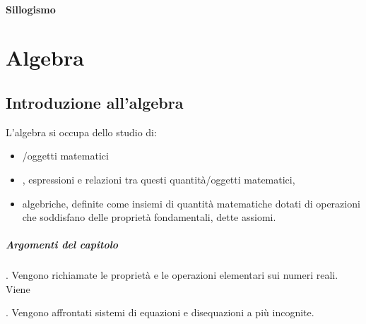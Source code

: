 \documentclass[letterpaper,10pt,italian]{jupyterBook}
\begin{document}
\subsection{Sillogismo}
\label{\detokenize{ch/logics:sillogismo}}\label{\detokenize{ch/logics:logics-syllogism}}
\sphinxstepscope


\part{Algebra}

\sphinxstepscope




\chapter{Introduzione all’algebra}
\label{\detokenize{ch/algebra:introduzione-all-algebra}}\label{\detokenize{ch/algebra:math-hs-algebra}}\label{\detokenize{ch/algebra::doc}}
\sphinxAtStartPar
L’algebra si occupa dello studio di:
\begin{itemize}
\item {} 
\sphinxAtStartPar
{}/oggetti matematici

\item {} 
\sphinxAtStartPar
{}, espressioni e relazioni tra questi quantità/oggetti matematici,

\item {} 
\sphinxAtStartPar
{} algebriche, definite come insiemi di quantità matematiche dotati di operazioni che soddisfano delle proprietà fondamentali, dette assiomi.

\end{itemize}
\subsubsection*{Argomenti del capitolo}

\sphinxAtStartPar
{\hyperref[\detokenize{ch/algebra/real-algebra:math-hs-algebra-real}]{}}. Vengono richiamate le proprietà e le operazioni elementari sui numeri reali. Viene

\sphinxAtStartPar
{\hyperref[\detokenize{ch/algebra/real-n-algebra:math-hs-algebra-real-n}]{}}. Vengono affrontati sistemi di equazioni e disequazioni a più incognite.
\end{document}
